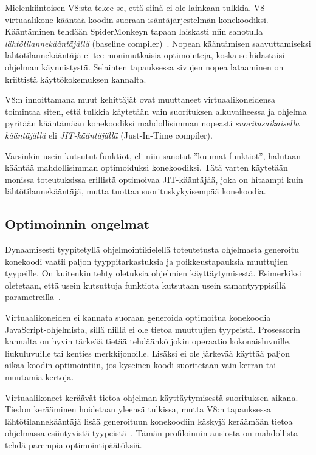 Mielenkiintoisen V8:sta tekee se, että siinä ei ole lainkaan tulkkia. V8-virtuaalikone kääntää koodin suoraan isäntäjärjestelmän konekoodiksi. Kääntäminen tehdään SpiderMonkeyn tapaan laiskasti niin sanotulla \textit{lähtötilannekääntäjällä} (baseline compiler)~\cite{v8design}. Nopean kääntämisen saavuttamiseksi lähtötilannekääntäjä ei tee monimutkaisia optimointeja, koska se hidastaisi ohjelman käynnistystä. Selainten tapauksessa sivujen nopea lataaminen on kriittistä käyttökokemuksen kannalta.

V8:n innoittamana muut kehittäjät ovat muuttaneet virtuaalikoneidensa toimintaa siten, että tulkkia käytetään vain suorituksen alkuvaiheessa ja ohjelma pyritään kääntämään konekoodiksi mahdollisimman nopeasti \textit{suoritusaikaisella kääntäjällä} eli \textit{JIT-kääntäjällä} (Just-In-Time compiler).

Varsinkin usein kutsutut funktiot, eli niin sanotut ''kuumat funktiot'', halutaan kääntää mahdollisimman optimoiduksi konekoodiksi. Tätä varten käytetään monissa toteutuksissa erillistä optimoivaa JIT-kääntäjää, joka on hitaampi kuin lähtötilannekääntäjä, mutta tuottaa suorituskykyisempää konekoodia.

\subsection{Optimoinnin ongelmat}

Dynaamisesti tyypitetyllä ohjelmointikielellä toteutetusta ohjelmasta generoitu konekoodi vaatii paljon tyyppitarkastuksia ja poikkeustapauksia muuttujien tyypeille. On kuitenkin tehty oletuksia ohjelmien käyttäytymisestä. Esimerkiksi oletetaan, että usein kutsuttuja funktiota kutsutaan usein samantyyppisillä parametreilla~\cite[s.~2]{jsanalysis}.

Virtuaalikoneiden ei kannata suoraan generoida optimoitua konekoodia JavaScript-ohjelmista, sillä niillä ei ole tietoa muuttujien tyypeistä. Prosessorin kannalta on hyvin tärkeää tietää tehdäänkö jokin operaatio kokonaisluvuille, liukuluvuille tai kenties merkkijonoille. Lisäksi ei ole järkevää käyttää paljon aikaa koodin optimointiin, jos kyseinen koodi suoritetaan vain kerran tai muutamia kertoja.

Virtuaalikoneet keräävät tietoa ohjelman käyttäytymisestä suorituksen aikana. Tiedon kerääminen hoidetaan yleensä tulkissa, mutta V8:n tapauksessa lähtötilannekääntäjä lisää generoituun konekoodiin käskyjä keräämään tietoa ohjelmassa esiintyvistä tyypeistä~\cite{v8compilers}. Tämän profiloinnin ansiosta on mahdollista tehdä parempia optimointipäätöksiä.

